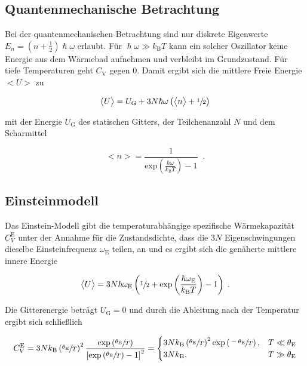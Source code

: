 \subsection{Quantenmechanische Betrachtung}

Bei der quantenmechanischen Betrachtung sind nur diskrete Eigenwerte $E_n = \left(n+\frac{1}{2}\right)\hslash \omega$
erlaubt. Für $\hslash \omega \gg k_\text{B} T$ kann ein solcher Oszillator keine Energie aus dem Wärmebad aufnehmen und 
verbleibt im Grundzustand. Für tiefe Temperaturen geht $C_\text{V}$ gegen $\num{0}$. 
Damit ergibt sich die mittlere Freie Energie $\bigl<U\bigr>$ zu

\begin{equation}
    \bigl<U\bigr> = U_\text{G} + 3N \hbar\omega \left(\bigl<n\bigr> + \sfrac{1}{2} \right) 
\end{equation}

mit der Energie $U_\text{G}$ des statischen Gitters, der Teilchenanzahl $N$ und dem Scharmittel

\begin{equation}
    \bigl<n\bigr> = \frac{1}{\text{exp}\left(\frac{\hbar \omega}{k_\text{B}T}\right)-1} \; \; .
\end{equation}

\subsection{Einsteinmodell}

Das Einstein-Modell gibt die temperaturabhängige spezifische Wärmekapazität $C_V^\text{E}$ unter der Annahme für die Zustandsdichte,
dass die $3N$ Eigenschwingungen dieselbe Einsteinfrequenz $\omega_\text{E}$ teilen, an und es ergibt sich die genäherte 
mittlere innere Energie

\begin{equation}
    \bigl<U\bigr> = 3N \hbar\omega_\text{E} \left(\sfrac{1}{2} + \text{exp}\left(\frac{\hbar \omega_\text{E}}{k_\text{B}T}\right)
     - 1\right) \; .
\end{equation}

Die  Gitterenergie beträgt $U_\text{G} = 0$ und durch die Ableitung nach der Temperatur ergibt sich schließlich

\begin{equation}
    C_V^\text{E} = 3Nk_\text{B} \left(\sfrac{\theta_\text{E}}{T}\right)^2 \frac{\text{exp}\left(\sfrac{\theta_\text{E}}{T}\right)}
    {\left[\text{exp}\left(\sfrac{\theta_\text{E}}{T}\right) - 1\right]^2} = 
    \begin{cases}
        3Nk_\text{B} \left(\sfrac{\theta_\text{E}}{T}\right)^2 \text{exp}\left(\sfrac{-\theta_\text{E}}{T}\right), 
        & T \ll \theta_\text{E} \\
        3Nk_\text{B} , & T \gg \theta_\text{E}
    \end{cases}
\end{equation}

